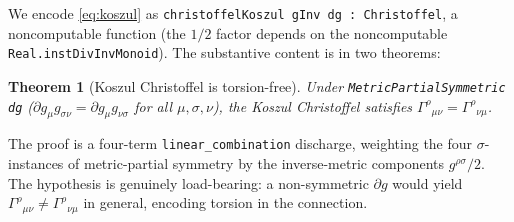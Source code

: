\documentclass[twocolumn]{revtex4-2}
\newtheorem{theorem}{Theorem}
\newcommand{\Christoffel}{\Gamma}
\newcommand{\MetricMatrix}{g}
\newcommand{\PartG}{\partial g}
\begin{document}
We encode \eqref{eq:koszul} as
\texttt{christoffelKoszul gInv dg : Christoffel}, a noncomputable
function (the $1/2$ factor depends on the noncomputable
\texttt{Real.instDivInvMonoid}). The substantive content is in two
theorems:

\begin{theorem}[Koszul Christoffel is torsion-free]\label{thm:koszul-tf}
Under \texttt{MetricPartialSymmetric dg}
($\PartG_{\mu}\MetricMatrix_{\sigma\nu} =
\PartG_{\mu}\MetricMatrix_{\nu\sigma}$ for all $\mu,\sigma,\nu$), the
Koszul Christoffel satisfies
$\Christoffel^{\rho}{}_{\mu\nu} = \Christoffel^{\rho}{}_{\nu\mu}$.
\end{theorem}

The proof is a four-term \texttt{linear\_combination} discharge,
weighting the four $\sigma$-instances of metric-partial symmetry by
the inverse-metric components $\MetricMatrix^{\rho\sigma}/2$. The
hypothesis is genuinely load-bearing: a non-symmetric $\PartG$ would
yield $\Christoffel^{\rho}{}_{\mu\nu} \neq \Christoffel^{\rho}{}_{\nu\mu}$
in general, encoding torsion in the connection.
\end{document}
